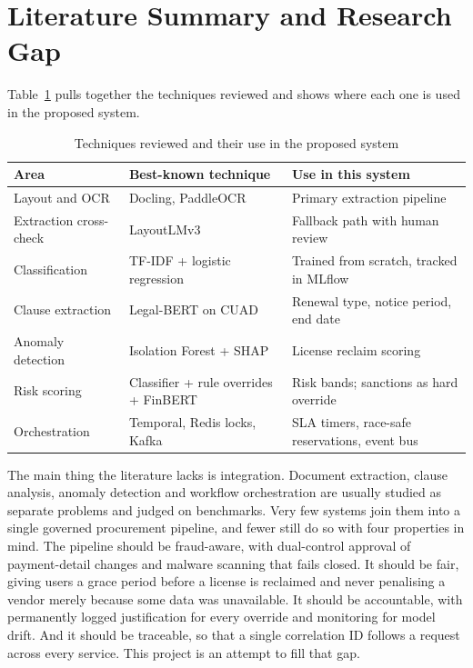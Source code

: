 \section{Literature Summary and Research Gap}

Table~\ref{tab:summary} pulls together the techniques reviewed and shows where each one is used in the proposed system.

\begin{table}[!htbp]
\centering
\small
\renewcommand{\arraystretch}{1.25}
\caption{Techniques reviewed and their use in the proposed system}
\label{tab:summary}
\begin{tabular}{|p{}|p{}|p{}|}
\hline
\raggedright \textbf{Area} & \raggedright \textbf{Best-known technique} & \raggedright \textbf{Use in this system} \tabularnewline \hline
\raggedright Layout and OCR & \raggedright Docling, PaddleOCR & \raggedright Primary extraction pipeline \tabularnewline \hline
\raggedright Extraction cross-check & \raggedright LayoutLMv3 & \raggedright Fallback path with human review \tabularnewline \hline
\raggedright Classification & \raggedright TF-IDF + logistic regression & \raggedright Trained from scratch, tracked in MLflow \tabularnewline \hline
\raggedright Clause extraction & \raggedright Legal-BERT on CUAD & \raggedright Renewal type, notice period, end date \tabularnewline \hline
\raggedright Anomaly detection & \raggedright Isolation Forest + SHAP & \raggedright License reclaim scoring \tabularnewline \hline
\raggedright Risk scoring & \raggedright Classifier + rule overrides + FinBERT & \raggedright Risk bands; sanctions as hard override \tabularnewline \hline
\raggedright Orchestration & \raggedright Temporal, Redis locks, Kafka & \raggedright SLA timers, race-safe reservations, event bus \tabularnewline \hline
\end{tabular}
\end{table}

The main thing the literature lacks is integration. Document extraction, clause analysis, anomaly detection and workflow orchestration are usually studied as separate problems and judged on benchmarks. Very few systems join them into a single governed procurement pipeline, and fewer still do so with four properties in mind. The pipeline should be fraud-aware, with dual-control approval of payment-detail changes and malware scanning that fails closed. It should be fair, giving users a grace period before a license is reclaimed and never penalising a vendor merely because some data was unavailable. It should be accountable, with permanently logged justification for every override and monitoring for model drift. And it should be traceable, so that a single correlation ID follows a request across every service. This project is an attempt to fill that gap.



